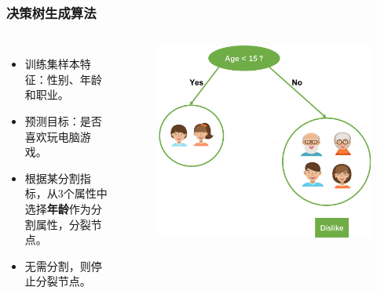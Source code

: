 \documentclass[10pt,aspectratio=43,mathserif]{beamer}
\begin{document}
        \begin{frame}
            \frametitle{\textbf{决策树生成算法}}
            \begin{columns}
                \footnotesize
                \begin{itemize}
                    \item 训练集样本特征：性别、年龄和职业。
                    \item 预测目标：是否喜欢玩电脑游戏。
                    \item 根据某分割指标，从3个属性中选择\textbf{年龄}作为分割属性，分裂节点。
                    \item 无需分割，则停止分裂节点。
                \end{itemize}

                \begin{figure}[!t]
                    \centering
                    \includegraphics[width=1.1\textwidth]{figures/dt_gen_1.png}
                \end{figure}
            \end{columns}
        \end{frame}
\end{document}
